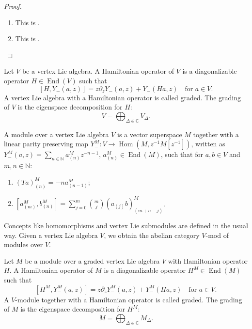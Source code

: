 \documentclass[a4paper, 12pt, reqno]{amsart}
\theoremstyle{remark}
\numberwithin{equation}{subsection}
\DeclareMathOperator{\End}{End}
\DeclareMathOperator{\Hom}{Hom}
\begin{document}
\begin{proof}\leavevmode
  \begin{enumerate}
  \item This is .
  \item This is . \qedhere
  \end{enumerate}
\end{proof}

Let $V$ be a vertex Lie algebra.
A Hamiltonian operator of $V$ is a diagonalizable operator $H \in \End(V)$ such that
\begin{equation}
  \label{eq:37}
  [H, Y_-(a, z)] = z\partial_zY_-(a, z) + Y_-(Ha, z) \quad \text{for }a \in V.
\end{equation}
A vertex Lie algebra with a Hamiltonian operator is called graded.
The grading of $V$ is the eigenspace decomposition for $H$:
\begin{equation*}
  V = \bigoplus_{\Delta \in \mathbb{C}}V_{\Delta}.
\end{equation*}

A module over a vertex Lie algebra $V$ is a vector superspace $M$ together with a linear parity preserving map $Y^M_-: V \to \Hom(M, z^{-1}M[z^{-1}])$, written as $Y^M_-(a, z) = \sum_{n \in \mathbb{N}}a^M_{(n)}z^{-n - 1}$, $a^M_{(n)} \in \End(M)$, such that for $a, b \in V$ and $m, n \in \mathbb{N}$:
\begin{enumerate}
\item $(Ta)^M_{(n)} = -na^M_{(n - 1)}$;
\item $[a^M_{(m)}, b^M_{(n)}] = \sum_{j = 0}^m\binom{m}{j}(a_{(j)}b)^M_{(m + n - j)}$.
\end{enumerate}
Concepts like homomorphisms and vertex Lie submodules are defined in the usual way.
Given a vertex Lie algebra $V$, we obtain the abelian category $V$-mod of modules over $V$.

Let $M$ be a module over a graded vertex Lie algebra $V$ with Hamiltonian operator $H$. 
A Hamiltonian operator of $M$ is a diagonalizable operator $H^M \in \End(M)$ such that
\begin{equation}
  \label{eq:38}
  [H^M, Y^M_-(a, z)] = z\partial_zY^M_-(a, z) + Y^M_-(Ha, z) \quad \text{for }a \in V.
\end{equation}
A $V$-module together with a Hamiltonian operator is called graded.
The grading of $M$ is the eigenspace decomposition for $H^M$:
\begin{equation*}
  M = \bigoplus_{\Delta \in \mathbb{C}}M_{\Delta}.
\end{equation*}
\end{document}
